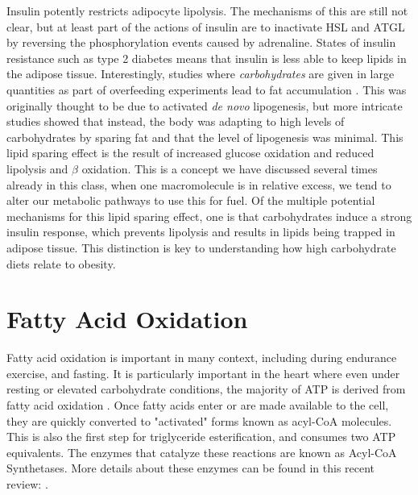 \documentclass{tufte-handout}
\begin{document}
Insulin potently restricts adipocyte lipolysis.  The mechanisms of this are still not clear, but at least part of the actions of insulin are to inactivate HSL and ATGL by reversing the phosphorylation events caused by adrenaline.   States of insulin resistance such as type 2 diabetes means that insulin is less able to keep lipids in the adipose tissue.  Interestingly, studies where \emph{carbohydrates} are given in large quantities as part of overfeeding experiments lead to fat accumulation \citep{Acheson1988}.  This was originally thought to be due to activated \textit{de novo} lipogenesis, but more intricate studies showed that instead, the body was adapting to high levels of carbohydrates by sparing fat \citep{McDevitt2001} and that the level of lipogenesis was minimal.  This lipid sparing effect is the result of increased glucose oxidation and reduced lipolysis and $\beta$ oxidation.  This is a concept we have discussed several times already in this class, when one macromolecule is in relative excess, we tend to alter our metabolic pathways to use this for fuel.  Of the multiple potential mechanisms for this lipid sparing effect, one is that carbohydrates induce a strong insulin response, which prevents lipolysis and results in lipids being trapped in adipose tissue.  This distinction is key to understanding how high carbohydrate diets relate to obesity.

\section{Fatty Acid Oxidation}

Fatty acid oxidation is important in many context, including during endurance exercise, and fasting.  It is particularly important in the heart where even under resting or elevated carbohydrate conditions, the majority of ATP is derived from fatty acid oxidation \citep{Neeley1974}.  Once fatty acids enter or are made available to the cell, they are quickly converted to "activated" forms known as acyl-CoA molecules.  This is also the first step for triglyceride esterification, and consumes two ATP equivalents.  The enzymes that catalyze these reactions are known as Acyl-CoA Synthetases.  More details about these enzymes can be found in this recent review: \citep{Grevengoed2014}.
\end{document}
